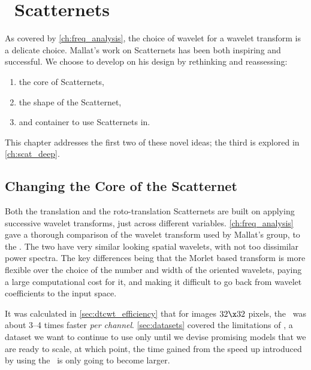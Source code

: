 \chapter{\DTCWT\ Scatternets}\label{ch:dtcwt_scatternets}
As covered by \autoref{ch:freq_analysis}, the choice of wavelet for a wavelet
transform is a delicate choice. Mallat's work on Scatternets has been both
inspiring and successful. We choose to develop on his design by rethinking and
reassessing:
\begin{enumerate}
  \item the core of Scatternets, 
  \item the shape of the Scatternet, 
  \item and container to use Scatternets in.
\end{enumerate}

This chapter addresses the first two of these novel ideas; the third is
explored in \autoref{ch:scat_deep}.

\section{Changing the Core of the Scatternet}
  Both the translation and the roto-translation Scatternets are built on applying
  successive wavelet transforms, just across different variables.
  \autoref{ch:freq_analysis} gave a thorough comparison of the wavelet transform
  used by Mallat's group, to the \DTCWT\@. The two have very similar looking
  spatial wavelets, with not too dissimilar power spectra. The key differences
  being that the Morlet based transform is more flexible over the choice of the
  number and width of the oriented wavelets, paying a large computational cost
  for it, and making it difficult to go back from wavelet coefficients to the
  input space. 


  It was calculated in \autoref{sec:dtcwt_efficiency} that for images
  $32\x 32$ pixels, the \DTCWT\ was about 3--4 times faster \emph{per channel}.
  \autoref{sec:datasets} covered the limitations of \cifar, a dataset we want to
  continue to use only until we devise promising models that we are ready to
  scale, at which point, the time gained from the speed up introduced by using
  the \DTCWT\ is only going to become larger.

